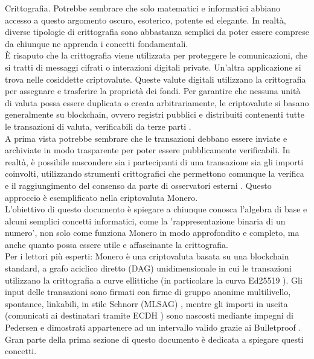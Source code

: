 

Crittografia. Potrebbe sembrare che solo matematici e informatici abbiano accesso a questo argomento oscuro, esoterico, potente ed elegante. In realtà, diverse tipologie di crittografia sono abbastanza semplici da poter essere comprese da chiunque ne apprenda i concetti fondamentali.
\\ \newline
È risaputo che la crittografia viene utilizzata per proteggere le comunicazioni, che si tratti di messaggi cifrati o interazioni digitali private. Un'altra applicazione si trova nelle cosiddette criptovalute. Queste valute digitali utilizzano la crittografia per assegnare e trasferire la proprietà dei fondi. Per garantire che nessuna unità di valuta possa essere duplicata o creata arbitrariamente, le criptovalute si basano generalmente su blockchain, ovvero registri pubblici e distribuiti contenenti tutte le transazioni di valuta, verificabili da terze parti \cite{Nakamoto_bitcoin}.
\\ \newline
A prima vista potrebbe sembrare che le transazioni debbano essere inviate e archiviate in modo trasparente per poter essere pubblicamente verificabili. In realtà, è possibile nascondere sia i partecipanti di una transazione sia gli importi coinvolti, utilizzando strumenti crittografici che permettono comunque la verifica e il raggiungimento del consenso da parte di osservatori esterni \cite{cryptoNoteWhitePaper}. Questo approccio è esemplificato nella criptovaluta Monero.
\\ \newline
L'obiettivo di questo documento è spiegare a chiunque conosca l'algebra di base e alcuni semplici concetti informatici, come la 'rappresentazione binaria di un numero', non solo come funziona Monero in modo approfondito e completo, ma anche quanto possa essere utile e affascinante la crittografia.
\\ \newline
Per i lettori più esperti: Monero è una criptovaluta basata su una blockchain standard, a grafo aciclico diretto (DAG) unidimensionale \cite{Nakamoto_bitcoin} in cui le transazioni utilizzano la crittografia a curve ellittiche (in particolare la curva Ed25519 \cite{Bernstein2008}). Gli input delle transazioni sono firmati con firme di gruppo anonime multilivello, spontanee, linkabili, in stile Schnorr (MLSAG) \cite{MRL-0005-ringct}, mentre gli importi in uscita (comunicati ai destinatari tramite ECDH \cite{Diffie-Hellman}) sono nascosti mediante impegni di Pedersen \cite{maxwell-ct} e dimostrati appartenere ad un intervallo valido grazie ai Bulletproof \cite{Bulletproofs_paper}. Gran parte della prima sezione di questo documento è dedicata a spiegare questi concetti.